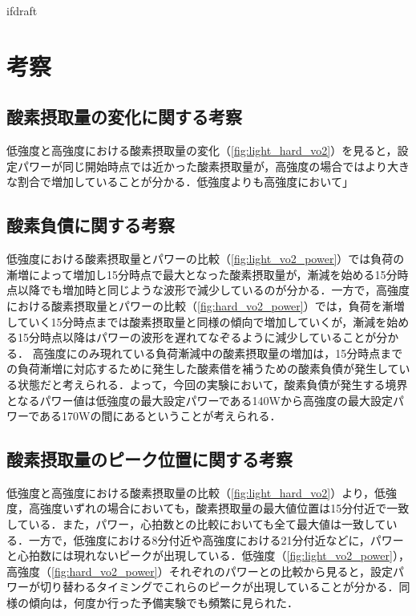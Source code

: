 \expandafter\ifx\csname ifdraft\endcsname\relax
 
\fi

\section{考察}

\subsection{酸素摂取量の変化に関する考察}

低強度と高強度における酸素摂取量の変化（\ref{fig:light_hard_vo2}）を見ると，設定パワーが同じ開始時点では近かった酸素摂取量が，高強度の場合ではより大きな割合で増加していることが分かる．低強度よりも高強度において」

\subsection{酸素負債に関する考察}

低強度における酸素摂取量とパワーの比較（\ref{fig:light_vo2_power}）では負荷の漸増によって増加し15分時点で最大となった酸素摂取量が，漸減を始める15分時点以降でも増加時と同じような波形で減少しているのが分かる．一方で，高強度における酸素摂取量とパワーの比較（\ref{fig:hard_vo2_power}）では，負荷を漸増していく15分時点までは酸素摂取量と同様の傾向で増加していくが，漸減を始める15分時点以降はパワーの波形を遅れてなぞるように減少していることが分かる．
高強度にのみ現れている負荷漸減中の酸素摂取量の増加は，15分時点までの負荷漸増に対応するために発生した酸素借を補うための酸素負債が発生している状態だと考えられる．よって，今回の実験において，酸素負債が発生する境界となるパワー値は低強度の最大設定パワーである140Wから高強度の最大設定パワーである170Wの間にあるということが考えられる．

\subsection{酸素摂取量のピーク位置に関する考察}

低強度と高強度における酸素摂取量の比較（\ref{fig:light_hard_vo2}）より，低強度，高強度いずれの場合においても，酸素摂取量の最大値位置は15分付近で一致している．また，パワー，心拍数との比較においても全て最大値は一致している．一方で，低強度における8分付近や高強度における21分付近などに，パワーと心拍数には現れないピークが出現している．低強度（\ref{fig:light_vo2_power}），高強度（\ref{fig:hard_vo2_power}）それぞれのパワーとの比較から見ると，設定パワーが切り替わるタイミングでこれらのピークが出現していることが分かる．同様の傾向は，何度か行った予備実験でも頻繁に見られた．

